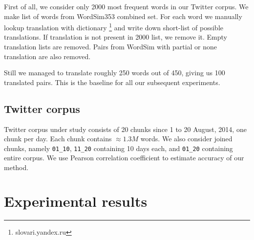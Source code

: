 \documentclass[11pt,letterpaper]{article}
\begin{document}
First of all, we consider only 2000 most frequent words in our Twitter corpus.  
We make list of words from WordSim353 combined set. For each word we manually 
lookup translation with dictionary \footnote{slovari.yandex.ru} and write down short-list 
of possible translations. If translation is not present in 2000 list, we remove it. 
Empty translation lists are removed. Pairs from WordSim with partial or none 
translation are also removed.

Still we managed to translate roughly 250 words out of 450, giving us 100 translated pairs.
This is the baseline for all our subsequent experiments. 

\subsection{Twitter corpus}

Twitter corpus under study consists of 20 chunks since 1 to 20 August, 2014, one chunk per day.
Each chunk contains $\approx 1.3M$ words.
We also consider joined chunks, namely {\tt 01\_10}, {\tt 11\_20} containing 10 days each, and 
{\tt 01\_20} containing entire corpus.
We use Pearson correlation coefficient to estimate accuracy of our method.

\section{Experimental results}
\end{document}
